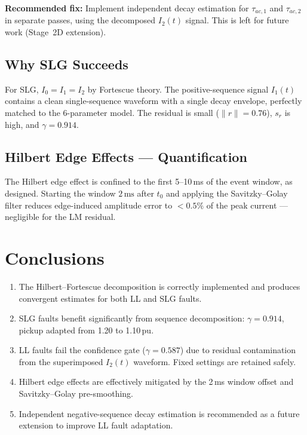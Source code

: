 \documentclass[12pt,a4paper]{article}
\theoremstyle{definition}
\theoremstyle{plain}
\newcommand{\mss}{\,\text{ms}}
\begin{document}
\textbf{Recommended fix:} Implement independent decay estimation for
$\tau_{ac,1}$ and $\tau_{ac,2}$ in separate passes, using the decomposed
$I_2(t)$ signal.  This is left for future work (Stage~2D extension).

\subsection{Why SLG Succeeds}
\label{sec:disc:slg}

For SLG, $I_0 = I_1 = I_2$ by Fortescue theory.  The positive-sequence
signal $I_1(t)$ contains a clean single-sequence waveform with a single
decay envelope, perfectly matched to the 6-parameter model.  The residual
is small ($\lVert r\rVert = 0.76$), $s_r$ is high, and $\gamma = 0.914$.

\subsection{Hilbert Edge Effects — Quantification}
\label{sec:disc:hilbert}

The Hilbert edge effect is confined to the first 5--10\,ms of the event
window, as designed.  Starting the window $2\mss$ after $t_0$ and
applying the Savitzky--Golay filter reduces edge-induced amplitude error
to $< 0.5\%$ of the peak current — negligible for the LM residual.

\section{Conclusions}
\label{sec:conc}

\begin{enumerate}
  \item The Hilbert--Fortescue decomposition is correctly implemented and
        produces convergent estimates for both LL and SLG faults.
  \item SLG faults benefit significantly from sequence decomposition:
        $\gamma = 0.914$, pickup adapted from 1.20 to 1.10\,pu.
  \item LL faults fail the confidence gate ($\gamma = 0.587$) due to
        residual contamination from the superimposed $I_2(t)$ waveform.
        Fixed settings are retained safely.
  \item Hilbert edge effects are effectively mitigated by the 2\,ms
        window offset and Savitzky--Golay pre-smoothing.
  \item Independent negative-sequence decay estimation is recommended
        as a future extension to improve LL fault adaptation.
\end{enumerate}


\end{document}
